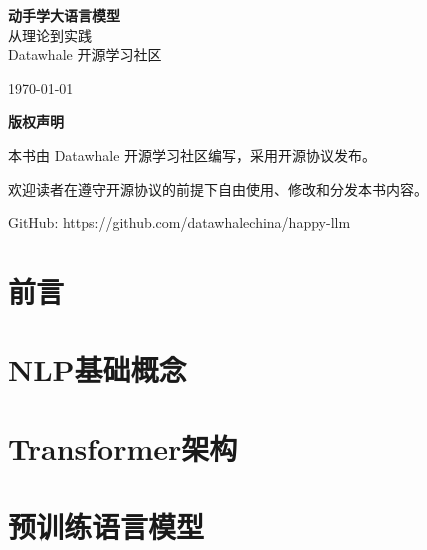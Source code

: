 \documentclass[12pt,a4paper]{book}
\begin{document}
\begin{titlepage}
    \centering
    \vspace*{2cm}
    
    {\Huge\bfseries 动手学大语言模型}\\[2cm]
    
    {\Large 从理论到实践}\\[1cm]
    
    {\large Datawhale 开源学习社区}\\[2cm]
    
    \vfill
    
    {\large \today}
\end{titlepage}

\newpage
\thispagestyle{empty}
\vspace*{2cm}
\begin{center}
    \textbf{版权声明}
    
    \vspace{1cm}
    
    本书由 Datawhale 开源学习社区编写，采用开源协议发布。
    
    欢迎读者在遵守开源协议的前提下自由使用、修改和分发本书内容。
    
    \vspace{1cm}
    
    GitHub: https://github.com/datawhalechina/happy-llm
\end{center}

\tableofcontents
\newpage

\chapter*{前言}


\chapter{NLP基础概念}


\chapter{Transformer架构}


\chapter{预训练语言模型}

\end{document}

